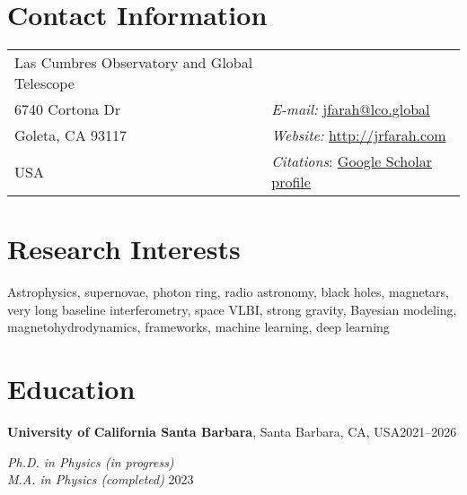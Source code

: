 \documentclass[margin,line]{res}
\begin{document}
\begin{resume}

\section{\sc Contact Information}
\vspace{.05in}
\begin{tabular}{@{}p{3in}p{4in}}
Las Cumbres Observatory and Global Telescope \\             
6740 Cortona Dr  & {\it E-mail:} \href{mailto:jfarah@lco.global}{\color{blue}jfarah@lco.global}\\
Goleta, CA 93117  & {\it Website:} \href{http://jrfarah.com}{\color{blue}http://jrfarah.com} \\
USA & \textit{Citations}: \href{https://scholar.google.com/citations?hl=en&user=EVnW70sAAAAJ}{\color{blue}Google Scholar profile}\\
\end{tabular}


\section{\sc Research Interests}

Astrophysics, supernovae, photon ring, radio astronomy, black holes, magnetars, very long baseline interferometry, space VLBI, strong gravity, Bayesian modeling, magnetohydrodynamics, frameworks, machine learning, deep learning

\vspace*{-1mm}
\section{\sc Education}

{\bf University of California Santa Barbara}, Santa Barbara, CA, USA\hfill 2021--2026

\vspace{-.35cm}
{\em Ph.D. in Physics (in progress)}\\
{\em M.A. in Physics (completed) } \hfill 2023


\end{resume}
\end{document}

